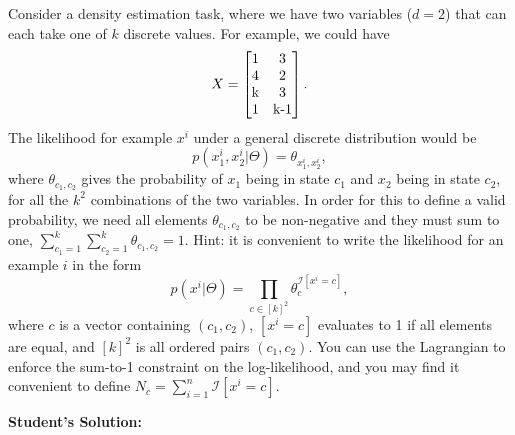 \documentclass{article}
\begin{document}
Consider a density estimation task, where we have two variables ($d=2$) that can each take one of $k$ discrete values. For example, we could have
\[
X = \mat{1 & 3\\4 & 2\\$k$ & 3\\1 & $k-1$}.
\]
The likelihood for example $x^i$ under a general discrete distribution would be
\[
p(x^i_1, x^i_2 | \Theta) = \theta_{x_1^i,x_2^i},
\]
where $\theta_{c_1,c_2}$ gives the probability of $x_1$ being in state $c_1$ and $x_2$ being in state $c_2$, for all the $k^2$ combinations of the two variables. In order for this to define a valid probability, we need all elements $\theta_{c_1,c_2}$ to be non-negative and they must sum to one, $\sum_{c_1=1}^k\sum_{c_2=1}^k \theta_{c_1,c_2} = 1$.
Hint: it is convenient to write the likelihood for an example $i$ in the form
\[
p(x^i | \Theta) = \prod_{c \in [k]^2}\theta_c^{\mathcal{I}[x^i = c]},
\]
where $c$ is a vector containing $(c_1,c_2)$, $[x^i = c]$ evaluates to 1 if all elements are equal, and $[k]^2$ is all ordered pairs $(c_1,c_2)$. You can use the Lagrangian to enforce the sum-to-1 constraint on the log-likelihood, and you may find it convenient to define $N_c = \sum_{i=1}^n \mathcal{I}[x^i = c]$.


\textbf{Student's Solution:}
\end{document}
